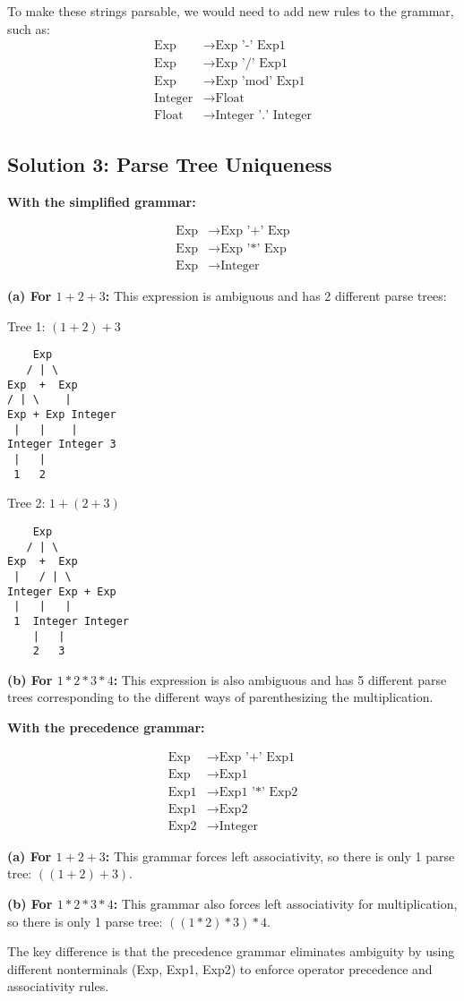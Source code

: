 \documentclass[12pt]{article}
\begin{document}
To make these strings parsable, we would need to add new rules to the grammar, such as:
\begin{align}
\text{Exp} &\to \text{Exp '-' Exp1} \\
\text{Exp} &\to \text{Exp '/' Exp1} \\
\text{Exp} &\to \text{Exp 'mod' Exp1} \\
\text{Integer} &\to \text{Float} \\
\text{Float} &\to \text{Integer '.' Integer}
\end{align}

\subsection*{Solution 3: Parse Tree Uniqueness}

\textbf{With the simplified grammar:}

\begin{align}
\text{Exp} &\to \text{Exp '+' Exp} \\
\text{Exp} &\to \text{Exp '*' Exp} \\
\text{Exp} &\to \text{Integer}
\end{align}

\textbf{(a) For $1+2+3$:} This expression is ambiguous and has 2 different parse trees:

Tree 1: $(1+2)+3$
\begin{verbatim}
    Exp
   / | \
Exp  +  Exp
/ | \    |
Exp + Exp Integer
 |   |    |
Integer Integer 3
 |   |
 1   2
\end{verbatim}

Tree 2: $1+(2+3)$
\begin{verbatim}
    Exp
   / | \
Exp  +  Exp
 |   / | \
Integer Exp + Exp
 |   |   |
 1  Integer Integer
    |   |
    2   3
\end{verbatim}

\textbf{(b) For $1*2*3*4$:} This expression is also ambiguous and has 5 different parse trees corresponding to the different ways of parenthesizing the multiplication.

\textbf{With the precedence grammar:}

\begin{align}
\text{Exp} &\to \text{Exp '+' Exp1} \\
\text{Exp} &\to \text{Exp1} \\
\text{Exp1} &\to \text{Exp1 '*' Exp2} \\
\text{Exp1} &\to \text{Exp2} \\
\text{Exp2} &\to \text{Integer}
\end{align}

\textbf{(a) For $1+2+3$:} This grammar forces left associativity, so there is only 1 parse tree: $((1+2)+3)$.

\textbf{(b) For $1*2*3*4$:} This grammar also forces left associativity for multiplication, so there is only 1 parse tree: $((1*2)*3)*4$.

The key difference is that the precedence grammar eliminates ambiguity by using different nonterminals (Exp, Exp1, Exp2) to enforce operator precedence and associativity rules.
\end{document}
